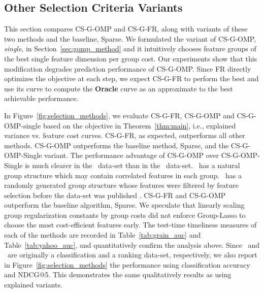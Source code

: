 \subsection{Other Selection Criteria Variants}
\label{sec:selection_methods}

This section compares CS-G-OMP and CS-G-FR, along with 
variants of these two methods and the baseline, Sparse. 
We formulated the variant of CS-G-OMP, \textit{single}, in Section~\ref{sec:gomp_method} and it intuitively chooses feature groups of the best single feature dimension per group cost. Our experiments show that this modification degrades prediction performance of CS-G-OMP. 
Since FR directly optimizes the objective at each step, we expect CS-G-FR to perform the best and use its curve to compute the \textbf{Oracle} curve as an approximate to the best achievable performance.

In Figure~\ref{fig:selection_methods}, we evaluate CS-G-FR, CS-G-OMP and CS-G-OMP-single based on the objective in Theorem~\ref{thm:main}, i.e., explained variance vs. feature cost curves. 
CS-G-FR, as expected, outperforms all other methods. CS-G-OMP outperforms the baseline method, Sparse, and the CS-G-OMP-Single variant. 
The performance advantage of CS-G-OMP over CS-G-OMP-Single is much clearer in the \Grain\ data-set than in the \YahooLTR\ data-set. \Grain\ has a natural group structure which may contain correlated features in each group. \YahooLTR\ has a randomly generated group structure whose features were filtered by feature selection before the data-set was published \citep{yahoo_ltr}. CS-G-FR and CS-G-OMP outperform the baseline algorithm, Sparse. We speculate that linearly scaling group regularization constants by group costs did not enforce Group-Lasso to choose the most cost-efficient features early. 
The test-time timeliness measures of each of the methods are recorded in Table~\ref{tab:grain_auc} and Table~\ref{tab:yahoo_auc},
and quantitatively confirm the analysis above. Since \Grain\, and \YahooLTR\, are originally a classification and a ranking data-set, respectively, we also report in Figure~\ref{fig:selection_methods} the performance using classification accuracy and NDCG@5. This demonstrates the same qualitatively results as using explained variants. 

